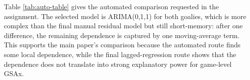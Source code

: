 \documentclass[
  10pt,
]{article}
\begin{document}
\begin{table}[H]
\centering
\caption{\label{tab:auto-table}auto.arima comparison on raw GSAx with raw save percentage and team xGF\% as xreg.}
\centering
{}
\end{table}

Table \ref{tab:auto-table} gives the automated comparison requested in the assignment. The selected model is ARIMA(0,1,1) for both goalies, which is more complex than the final manual residual model but still short-memory: after one difference, the remaining dependence is captured by one moving-average term. This supports the main paper's comparison because the automated route finds some local dependence, while the final lagged-regression route shows that the dependence does not translate into strong explanatory power for game-level GSAx.
\end{document}
